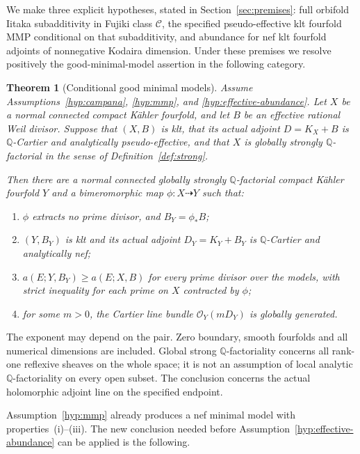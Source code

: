 \documentclass[11pt,letterpaper]{article}
\newcommand{\Q}{\mathbb{Q}}
\newcommand{\OO}{\mathcal{O}}
\newtheorem{theorem}{Theorem}[section]
\theoremstyle{definition}
\theoremstyle{remark}
\begin{document}
We make three explicit hypotheses, stated in
Section~\ref{sec:premises}: full orbifold Iitaka subadditivity in
Fujiki class \(\mathcal C\), the specified pseudo-effective klt
fourfold MMP conditional on that subadditivity, and abundance for nef
klt fourfold adjoints of nonnegative Kodaira dimension. Under these
premises we resolve positively the good-minimal-model assertion in
the following category.

\begin{theorem}[Conditional good minimal models]\label{thm:main}
Assume Assumptions~\ref{hyp:campana}, \ref{hyp:mmp}, and
\ref{hyp:effective-abundance}. Let \(X\) be a normal connected
compact K\"ahler fourfold, and let \(B\) be an effective rational
Weil divisor. Suppose that \((X,B)\) is klt, that its actual adjoint
\(D=K_X+B\) is \(\Q\)-Cartier and analytically
pseudo-effective, and that \(X\) is globally strongly
\(\Q\)-factorial in the sense of Definition~\ref{def:strong}.

Then there are a normal connected globally strongly
\(\Q\)-factorial compact K\"ahler fourfold \(Y\) and a
bimeromorphic map \(\phi:X\dashrightarrow Y\) such that:
\begin{enumerate}[label=\textup{(\roman*)}]
\item \(\phi\) extracts no prime divisor, and
      \(B_Y=\phi_*B\);
\item \((Y,B_Y)\) is klt and its actual adjoint
      \(D_Y=K_Y+B_Y\) is \(\Q\)-Cartier and analytically nef;
\item \(a(E;Y,B_Y)\ge a(E;X,B)\) for every prime divisor over
      the models, with strict inequality for each prime on \(X\)
      contracted by \(\phi\);
\item for some \(m>0\), the Cartier line bundle
      \(\OO_Y(mD_Y)\) is globally generated.
\end{enumerate}
\end{theorem}

The exponent may depend on the pair. Zero boundary, smooth fourfolds
and all numerical dimensions are included. Global strong
\(\Q\)-factoriality concerns all rank-one reflexive sheaves on
the whole space; it is not an assumption of local analytic
\(\Q\)-factoriality on every open subset. The conclusion concerns
the actual holomorphic adjoint line on the specified endpoint.

Assumption~\ref{hyp:mmp} already produces a nef minimal model with
properties~\textup{(i)}--\textup{(iii)}. The new conclusion needed
before Assumption~\ref{hyp:effective-abundance} can be applied is
the following.
\end{document}
